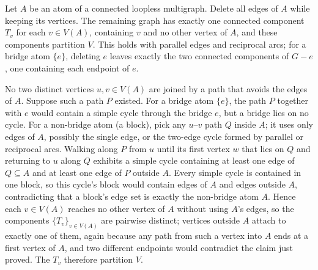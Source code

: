 \begin{lemma}\label{lem:atomcomponents}
Let $A$ be an atom of a connected loopless multigraph. Delete all
edges of $A$ while keeping its vertices. The remaining graph has
exactly one connected component $T_v$ for each $v\in V(A)$, containing
$v$ and no other vertex of $A$, and these components partition $V$.
This holds with parallel edges and reciprocal arcs; for a bridge atom
$\{e\}$, deleting $e$ leaves exactly the two connected components of
$G-e$, one containing each endpoint of $e$.
\end{lemma}
\begin{pf}
No two distinct vertices $u,v\in V(A)$ are joined by a path that
avoids the edges of $A$. Suppose such a path $P$ existed. For a bridge
atom $\{e\}$, the path $P$ together with $e$ would contain a simple
cycle through the bridge $e$, but a bridge lies on no cycle. For a
non-bridge atom (a block), pick any $u$--$v$ path $Q$ inside $A$; it
uses only edges of $A$, possibly the single edge, or the two-edge
cycle formed by parallel or reciprocal arcs. Walking along $P$ from $u$ until
its first vertex $w$ that lies on $Q$ and returning to $u$ along $Q$
exhibits a simple cycle containing at least one edge of $Q\subseteq A$
and at least one edge of $P$ outside $A$. Every simple cycle is
contained in one block, so this cycle's block would contain edges of
$A$ and edges outside $A$, contradicting that a block's edge set is
exactly the non-bridge atom $A$. Hence each $v\in V(A)$ reaches no
other vertex of $A$ without using $A$'s edges, so the components
$\{T_v\}_{v\in V(A)}$ are pairwise distinct; vertices outside $A$
attach to exactly one of them, again because any path from such a
vertex into $A$ ends at a first vertex of $A$, and two different
endpoints would contradict the claim just proved. The $T_v$ therefore
partition $V$.
\end{pf}

